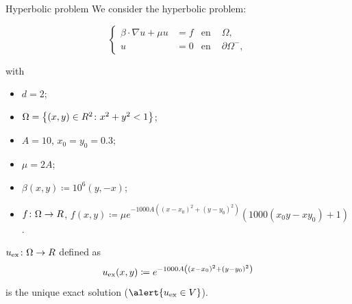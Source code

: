 		\begin{frame}{Hyperbolic problem}
			\scriptsize
			We consider the hyperbolic problem:
			\begin{block}{}
			\begin{equation*}
			\left\{
			\begin{aligned}
			\beta\cdot\nabla u+\mu u&=f & \text{en } &\Omega, \\
			u&=0 & \text{en } &\partial\Omega^-,
			\end{aligned}
			\right.
			\end{equation*}
			\end{block}
			with
			\begin{itemize}
				\item $d=2$;
				\item $\Omega=\left\{(x,y)\in\relax R^2\colon x^2+y^2<1 \right\}$;
				\item $A=10$, $x_0=y_0=0.3$;
				\item $\mu=2A$;
				\item $\beta(x,y)\coloneqq10^6(y,-x)$;
				\item $f\colon\Omega\to\relax R$, $f(x,y)\coloneqq \mu e^{-1000A\left((x-x_0)^2+(y-y_0)^2\right)}(1000(x_0 y -x y_0) + 1)$.
			\end{itemize}
			
			\vspace*{0.3cm}
			$u_{\text{ex}}\colon\Omega\to\relax R$ defined as
			\begin{equation*}
			u_{\text{ex}} (x,y)\coloneqq e^{-1000A\left((x-x_0)^2+(y-y_0)^2\right)}
			\end{equation*}
			is the \alert{unique exact solution} ($\alert{u_\text{ex}\in V}$).
			
			\end{frame}

